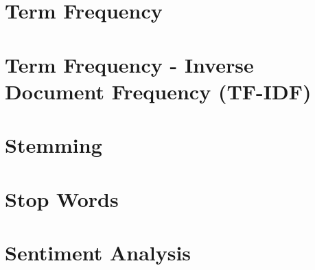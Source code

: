 \section{Term Frequency}

\section{Term Frequency - Inverse Document Frequency (TF-IDF)}

\section{Stemming}

\section{Stop Words}

\section{Sentiment Analysis}

